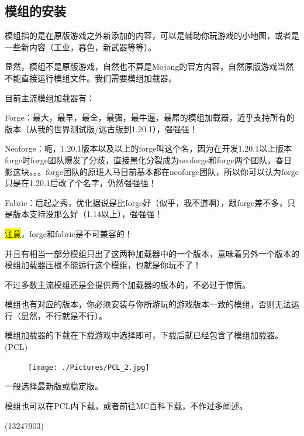 \documentclass[UTF8,a4paper]{article}
\begin{document}
		\subsection{模组的安装}
			\hypertarget{modsinstall}{}
			\par 模组指的是在原版游戏之外新添加的内容，可以是辅助你玩游戏的小地图，或者是一些新内容（工业，暮色，新武器等等）。
			\par 显然，模组不是原版游戏，自然也不算是Mojang的官方内容，自然原版游戏当然不能直接运行模组文件。我们需要模组加载器。
			\par 目前主流模组加载器有：
			\par Forge：最大，最早，最全，最强，最牛逼，最屌的模组加载器，近乎支持所有的版本（从我的世界测试版/远古版到1.20.1），强强强！
			\par Neoforge：呃，1.20.1版本以及以上的forge叫这个名，因为在开发1.20.1以上版本forge时forge团队爆发了分歧，直接黑化分裂成为neoforge和forge两个团队，春日影这块。。。forge团队的原班人马目前基本都在neoforge团队，所以你可以认为forge只是在1.20.1后改了个名字，仍然强强强！
			\par Fabric：后起之秀，优化据说是比forge好（似乎，我不道啊），跟forge差不多，只是版本支持没那么好（1.14以上），强强强！
			\par \colorbox{yellow}{注意}，forge和fabric是不可兼容的！
			\par 并且有相当一部分模组只出了这两种加载器中的一个版本，意味着另外一个版本的模组加载器压根不能运行这个模组，也就是你玩不了！
			\par 不过多数主流模组还是会提供两个加载器的版本的，不必过于惊慌。
			\par 模组也有对应的版本，你必须安装与你所游玩的游戏版本一致的模组，否则无法运行（显然，不行就是不行）。
			\par 模组加载器的下载在下载游戏中选择即可，下载后就已经包含了模组加载器。(PCL)
			\begin{figure}[H] %
				\centering %
				\texttt{[image: ./Pictures/PCL\_2.jpg]} %
			\end{figure}
			\par 一般选择最新版或稳定版。
			\par 模组也可以在PCL内下载，或者前往MC百科下载，不作过多阐述。
			\begin{flushright}(13247903)\end{flushright}
\end{document}
